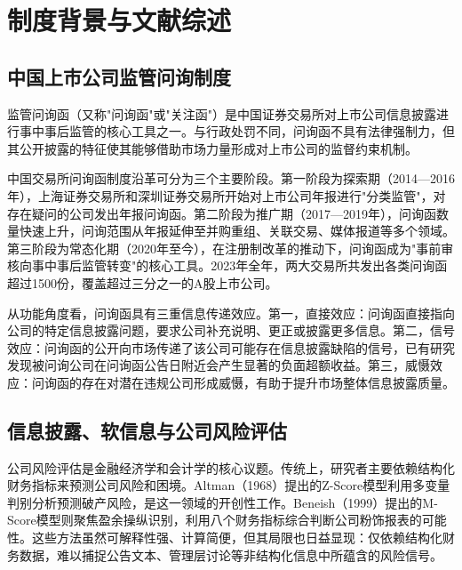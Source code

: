 
\section{制度背景与文献综述}

\subsection{中国上市公司监管问询制度}

监管问询函（又称"问询函"或"关注函"）是中国证券交易所对上市公司信息披露进行事中事后监管的核心工具之一。与行政处罚不同，问询函不具有法律强制力，但其公开披露的特征使其能够借助市场力量形成对上市公司的监督约束机制\citep{chen2019supervision}。

中国交易所问询函制度沿革可分为三个主要阶段。第一阶段为探索期（2014—2016年），上海证券交易所和深圳证券交易所开始对上市公司年报进行"分类监管"，对存在疑问的公司发出年报问询函。第二阶段为推广期（2017—2019年），问询函数量快速上升，问询范围从年报延伸至并购重组、关联交易、媒体报道等多个领域。第三阶段为常态化期（2020年至今），在注册制改革的推动下，问询函成为"事前审核向事中事后监管转变"的核心工具。2023年全年，两大交易所共发出各类问询函超过1500份，覆盖超过三分之一的A股上市公司。

从功能角度看，问询函具有三重信息传递效应。第一，直接效应：问询函直接指向公司的特定信息披露问题，要求公司补充说明、更正或披露更多信息。第二，信号效应：问询函的公开向市场传递了该公司可能存在信息披露缺陷的信号，已有研究发现被问询公司在问询函公告日附近会产生显著的负面超额收益\citep{li2019inquiry}。第三，威慑效应：问询函的存在对潜在违规公司形成威慑，有助于提升市场整体信息披露质量\citep{chen2019effective}。

\subsection{信息披露、软信息与公司风险评估}

公司风险评估是金融经济学和会计学的核心议题。传统上，研究者主要依赖结构化财务指标来预测公司风险和困境。Altman（1968）提出的Z-Score模型利用多变量判别分析预测破产风险，是这一领域的开创性工作\citep{altman1968financial}。Beneish（1999）提出的M-Score模型则聚焦盈余操纵识别，利用八个财务指标综合判断公司粉饰报表的可能性\citep{beneish1999detection}。这些方法虽然可解释性强、计算简便，但其局限也日益显现：仅依赖结构化财务数据，难以捕捉公告文本、管理层讨论等非结构化信息中所蕴含的风险信号。

